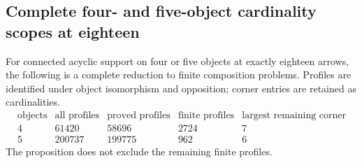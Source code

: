 \subsection{Complete four- and five-object cardinality scopes at eighteen}

\begin{proposition}
\label{CP2:A-four-five-eighteen-scopes}
For connected acyclic support on four or five objects at exactly eighteen
arrows, the following is a complete reduction to finite composition
problems. Profiles are identified under object isomorphism and
opposition; corner entries are retained as cardinalities.
\[
\begin{array}{c|rrrr}
\text{objects}&\text{all profiles}&\text{proved profiles}&
\text{finite profiles}&\text{largest remaining corner}\\\hline
4&61420&58696&2724&7\\
5&200737&199775&962&6
\end{array}
\]
The proposition does not exclude the remaining finite profiles.
\end{proposition}
